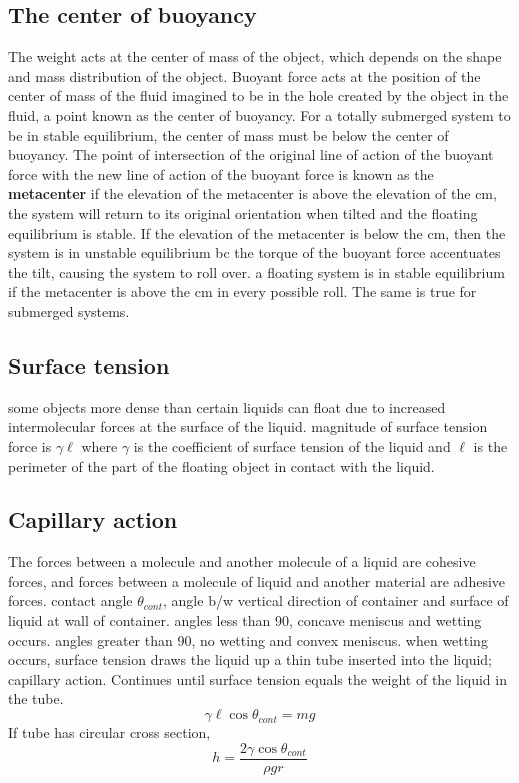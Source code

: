 \documentclass[twocolumn]{article}
\begin{document}
\subsection{The center of buoyancy}
\begin{outline}
    \1 The weight acts at the center of mass of the object, which depends on the shape and mass distribution of the object. 
    \1 Buoyant force acts at the position of the center of mass of the fluid imagined to be in the hole created by the object in the fluid, a point known as the center of buoyancy. 
    \1 For a totally submerged system to be in stable equilibrium, the center of mass must be below the center of buoyancy.
    \1 The point of intersection of the original line of action of the buoyant force with the new line of action of the buoyant force is known as the \textbf{metacenter}
    \1 if the elevation of the metacenter is above the elevation of the cm, the system will return to its original orientation when tilted and the floating equilibrium is stable. If the elevation of the metacenter is below the cm, then the system is in unstable equilibrium bc the torque of the buoyant force accentuates the tilt, causing the system to roll over.
    \1 a floating system is in stable equilibrium if the metacenter is above the cm in every possible roll. The same is true for submerged systems. 
\end{outline}
\subsection{Surface tension}
\begin{outline}
    \1 some objects more dense than certain liquids can float due to increased intermolecular forces at the surface of the liquid. 
    \1 magnitude of surface tension force is \(\gamma\ell\) where $\gamma$ is the coefficient of surface tension of the liquid and $\ell$ is the perimeter of the part of the floating object in contact with the liquid. 
\end{outline}
\subsection{Capillary action}
\begin{outline}
    \1 The forces between a molecule and another molecule of a liquid are cohesive forces, and forces between a molecule of liquid and another material are adhesive forces. 
    \1 contact angle $\theta_{cont}$, angle b/w vertical direction of container and surface of liquid at wall of container. 
        \2 angles less than 90, concave meniscus and wetting occurs. 
        \2 angles greater than 90, no wetting and convex meniscus. 
    \1 when wetting occurs, surface tension draws the liquid up a thin tube inserted into the liquid; capillary action. Continues until surface tension equals the weight of the liquid in the tube. \[\gamma\ell\cos{\theta_{cont}}=mg\]
    \1 If tube has circular cross section, \[h=\dfrac{2\gamma\cos{\theta_{cont}}}{\rho gr}\]
\end{outline}
\end{document}

